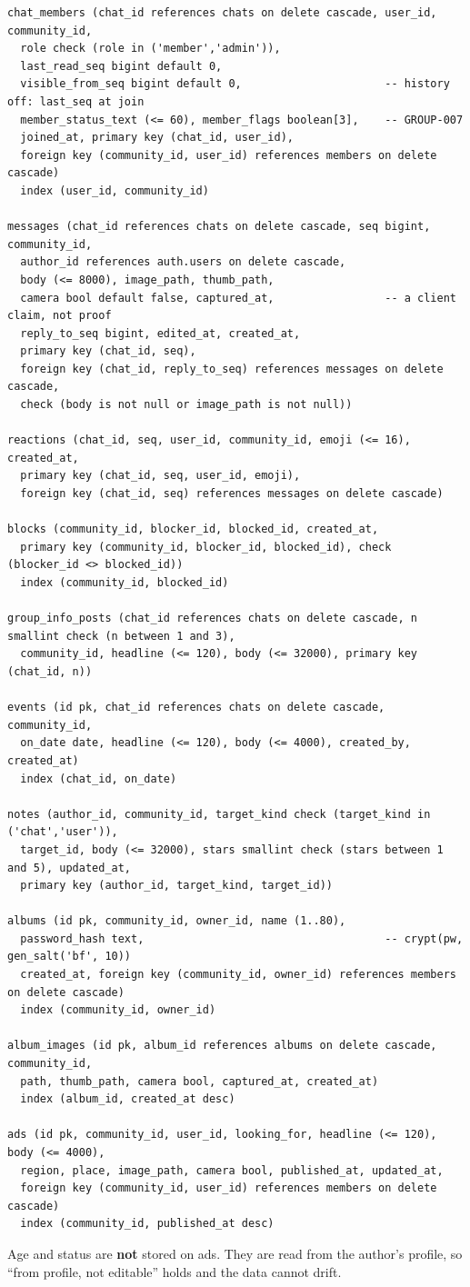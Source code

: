 \documentclass[11pt,a4paper]{article}
\begin{document}
{\begin{verbatim}
chat_members (chat_id references chats on delete cascade, user_id, community_id,
  role check (role in ('member','admin')),
  last_read_seq bigint default 0,
  visible_from_seq bigint default 0,                      -- history off: last_seq at join
  member_status_text (<= 60), member_flags boolean[3],    -- GROUP-007
  joined_at, primary key (chat_id, user_id),
  foreign key (community_id, user_id) references members on delete cascade)
  index (user_id, community_id)

messages (chat_id references chats on delete cascade, seq bigint, community_id,
  author_id references auth.users on delete cascade,
  body (<= 8000), image_path, thumb_path,
  camera bool default false, captured_at,                 -- a client claim, not proof
  reply_to_seq bigint, edited_at, created_at,
  primary key (chat_id, seq),
  foreign key (chat_id, reply_to_seq) references messages on delete cascade,
  check (body is not null or image_path is not null))

reactions (chat_id, seq, user_id, community_id, emoji (<= 16), created_at,
  primary key (chat_id, seq, user_id, emoji),
  foreign key (chat_id, seq) references messages on delete cascade)

blocks (community_id, blocker_id, blocked_id, created_at,
  primary key (community_id, blocker_id, blocked_id), check (blocker_id <> blocked_id))
  index (community_id, blocked_id)

group_info_posts (chat_id references chats on delete cascade, n smallint check (n between 1 and 3),
  community_id, headline (<= 120), body (<= 32000), primary key (chat_id, n))

events (id pk, chat_id references chats on delete cascade, community_id,
  on_date date, headline (<= 120), body (<= 4000), created_by, created_at)
  index (chat_id, on_date)

notes (author_id, community_id, target_kind check (target_kind in ('chat','user')),
  target_id, body (<= 32000), stars smallint check (stars between 1 and 5), updated_at,
  primary key (author_id, target_kind, target_id))

albums (id pk, community_id, owner_id, name (1..80),
  password_hash text,                                     -- crypt(pw, gen_salt('bf', 10))
  created_at, foreign key (community_id, owner_id) references members on delete cascade)
  index (community_id, owner_id)

album_images (id pk, album_id references albums on delete cascade, community_id,
  path, thumb_path, camera bool, captured_at, created_at)
  index (album_id, created_at desc)

ads (id pk, community_id, user_id, looking_for, headline (<= 120), body (<= 4000),
  region, place, image_path, camera bool, published_at, updated_at,
  foreign key (community_id, user_id) references members on delete cascade)
  index (community_id, published_at desc)
\end{verbatim}
}
Age and status are \textbf{not} stored on ads. They are read from the author's profile, so ``from profile, not
editable'' holds and the data cannot drift.
\end{document}
